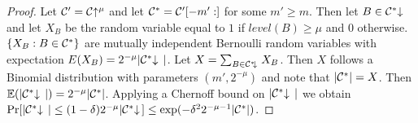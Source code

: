 \begin{proof}
Let $\mathcal{C}' = \mathcal{C}\negthickspace\uparrow^\mu$ and let $\mathcal{C}^* =
\mathcal{C}'[-m':]$ for some $m' \geq m$. Then let $B \in \mathcal{C}^*\negthickspace\downarrow\,$ and let
$X_B$ be the random variable equal to $1$ if $\textit{level}(B) \geq \mu$ and
$0$ otherwise. $\{ X_B: B \in \mathcal{C}^* \}$ are mutually independent Bernoulli
random variables with expectation $E(X_B) = 2^{-\mu}|\mathcal{C}^*\negthickspace\downarrow\,|$. Let
$X = \sum_{B \in \mathcal{C}^*\negthickspace\downarrow\,}{X_B}$. Then $X$ follows a Binomial
distribution with parameters $(m', 2^{-\mu})$ and note that $|\mathcal{C}^*| = X$.
Then $\mathbb{E}(|\mathcal{C}^*\negthickspace\downarrow\,|) = 2^{-\mu}|\mathcal{C}^*|$. Applying a Chernoff bound on
$|\mathcal{C}^*\negthickspace\downarrow\,|$ we obtain
$\Pr[|\mathcal{C}^*\negthickspace\downarrow\,| \leq (1 - \delta)2^{-\mu}|\mathcal{C}^*\negthickspace\downarrow\,] \leq
\exp(-\delta^2 2^{-\mu-1}|\mathcal{C}^*|)$.
\Qed
\end{proof}
